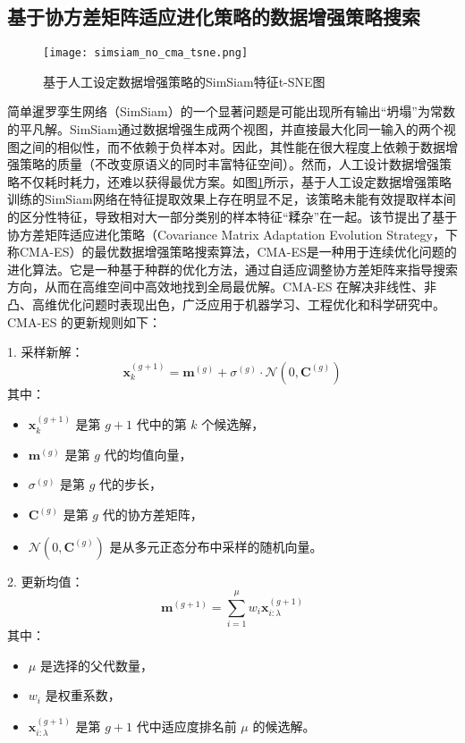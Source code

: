 \documentclass[master]{thesis-uestc}
\begin{document}
\subsection{基于协方差矩阵适应进化策略的数据增强策略搜索}
\begin{figure}[h]
    \centering
    \texttt{[image: simsiam\_no\_cma\_tsne.png]}
    \caption{基于人工设定数据增强策略的SimSiam特征t-SNE图}
    \label{simsiam_no_cma_tsne}
\end{figure}
简单暹罗孪生网络（SimSiam）的一个显著问题是可能出现所有输出“坍塌”为常数的平凡解。SimSiam通过数据增强生成两个视图，并直接最大化同一输入的两个视图之间的相似性，而不依赖于负样本对。因此，其性能在很大程度上依赖于数据增强策略的质量（不改变原语义的同时丰富特征空间）。然而，人工设计数据增强策略不仅耗时耗力，还难以获得最优方案。如图\ref{simsiam_no_cma_tsne}所示，基于人工设定数据增强策略训练的SimSiam网络在特征提取效果上存在明显不足，该策略未能有效提取样本间的区分性特征，导致相对大一部分类别的样本特征“糅杂”在一起。该节提出了基于协方差矩阵适应进化策略（Covariance Matrix Adaptation Evolution Strategy，下称CMA-ES）的最优数据增强策略搜索算法，CMA-ES是一种用于连续优化问题的进化算法。它是一种基于种群的优化方法，通过自适应调整协方差矩阵来指导搜索方向，从而在高维空间中高效地找到全局最优解。CMA-ES 在解决非线性、非凸、高维优化问题时表现出色，广泛应用于机器学习、工程优化和科学研究中。CMA-ES 的更新规则如下：

1. 采样新解：
\begin{equation}
\mathbf{x}_k^{(g+1)} = \mathbf{m}^{(g)} + \sigma^{(g)} \cdot \mathcal{N}(0, \mathbf{C}^{(g)})
\label{eq:sample}
\end{equation}
其中：
\begin{itemize}
    \item \(\mathbf{x}_k^{(g+1)}\) 是第 \(g+1\) 代中的第 \(k\) 个候选解，
    \item \(\mathbf{m}^{(g)}\) 是第 \(g\) 代的均值向量，
    \item \(\sigma^{(g)}\) 是第 \(g\) 代的步长，
    \item \(\mathbf{C}^{(g)}\) 是第 \(g\) 代的协方差矩阵，
    \item \(\mathcal{N}(0, \mathbf{C}^{(g)})\) 是从多元正态分布中采样的随机向量。
\end{itemize}

2. 更新均值：
\begin{equation}
\mathbf{m}^{(g+1)} = \sum_{i=1}^{\mu} w_i \mathbf{x}_{i:\lambda}^{(g+1)}
\label{eq:mean_update}
\end{equation}
其中：
\begin{itemize}
    \item \(\mu\) 是选择的父代数量，
    \item \(w_i\) 是权重系数，
    \item \(\mathbf{x}_{i:\lambda}^{(g+1)}\) 是第 \(g+1\) 代中适应度排名前 \(\mu\) 的候选解。
\end{itemize}
\end{document}
